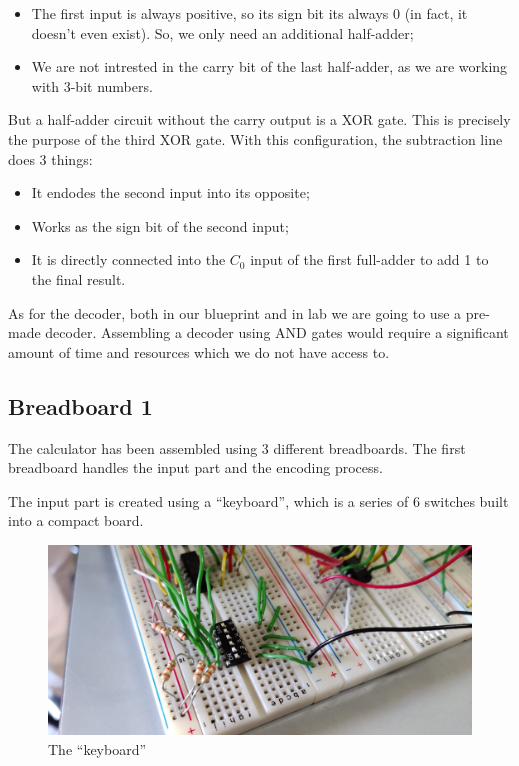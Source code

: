 \documentclass{article}
\begin{document}
\begin{itemize}
  \item The first input is always positive, so its sign bit its always 0 (in fact, it doesn't even exist). So, we only need an additional half-adder;
  \item We are not intrested in the carry bit of the last half-adder, as we are working with 3-bit numbers.
\end{itemize}

But a half-adder circuit without the carry output is a XOR gate. This is precisely the purpose of the third XOR gate. With this configuration, the subtraction line does 3 things:

\begin{itemize}
  \item It endodes the second input into its opposite;
  \item Works as the sign bit of the second input;
  \item It is directly connected into the $C_0$ input of the first full-adder to add 1 to the final result.
\end{itemize}

As for the decoder, both in our blueprint and in lab we are going to use a pre-made decoder. Assembling a decoder using AND gates would require a significant amount of time and resources which we do not have access to.

\subsection{Breadboard 1}

The calculator has been assembled using 3 different breadboards. The first breadboard handles the input part and the encoding process.

\vspace{3mm}

The input part is created using a ``keyboard'', which is a series of 6 switches built into a compact board. 
\begin{figure}[h]
  \centering
  \includegraphics[width=\linewidth]{breadboard1_bis}
  \caption{The ``keyboard''}
  \label{breadboard1_bis}
\end{figure}
\end{document}
